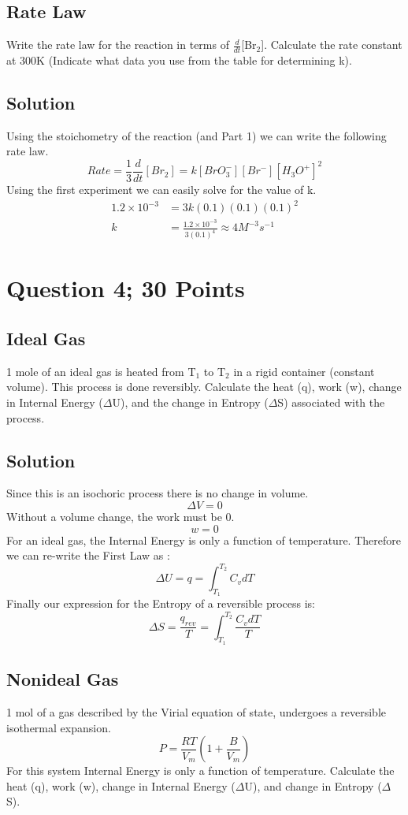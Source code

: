 \documentclass{article}
\newcommand{\be}{\begin{equation}}
\newcommand{\ee}{\end{equation}}
\begin{document}
\subsection*{Rate Law}
Write the rate law for the reaction in terms of $\frac{d}{dt}$[Br$_2$].
Calculate the rate constant at 300K (Indicate what data you use from the table for determining k). 

\subsection*{Solution}
Using the stoichometry of the reaction (and Part 1) we can write the following rate law. 
\be
Rate = \frac{1}{3}\frac{d}{dt}[Br_2] = k[BrO_3^-][Br^-][H_3O^+]^2
\ee
Using the first experiment we can easily solve for the value of k. 
\be
\begin{split}
1.2 \times 10^{-3} &= 3k (0.1)(0.1)(0.1)^2 \\
k &= \frac{1.2 \times 10^{-3}}{3(0.1)^4} \approx 4M^{-3}s^{-1}
\end{split}
\ee

\newpage

\section*{Question 4; 30 Points}

\subsection*{Ideal Gas}
1 mole of an ideal gas is heated from T$_1$ to T$_2$ in a rigid container (constant volume).
This process is done reversibly.
Calculate the heat (q), work (w), change in Internal Energy ($\Delta$U), and the change in Entropy ($\Delta$S) associated with the process. 

\subsection*{Solution}
Since this is an isochoric process there is no change in volume. 
\be
\Delta V = 0 
\ee
Without a volume change, the work must be 0. 
\be
w=0
\ee
For an ideal gas, the Internal Energy is only a function of temperature.
Therefore we can re-write the First Law as : 
\be
\Delta U = q = \int_{T_1}^{T_2}C_vdT
\ee
Finally our expression for the Entropy of a reversible process is: 
\be
\Delta S = \frac{q_{rev}}{T} = \int_{T_1}^{T_2}\frac{C_vdT}{T}
\ee

\subsection*{Nonideal Gas}
1 mol of a gas described by the Virial equation of state, undergoes a reversible isothermal expansion.
\be
P=\frac{RT}{V_m}\left(1 + \frac{B}{V_m}\right)
\ee
For this system Internal Energy is only a function of temperature.
Calculate the heat (q), work (w), change in Internal Energy ($\Delta$U), and change in Entropy ($\Delta$S).  
\end{document}
